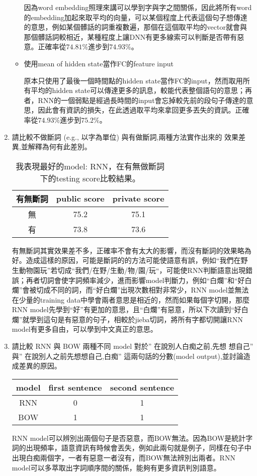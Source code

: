 \documentclass[12pt, a4paper]{article}
\begin{document}
\begin{enumerate}
\begin{itemize}
    因為word embedding照理來講可以學到字與字之間關係，因此將所有word的embedding加起來取平均的向量，可以某個程度上代表這個句子想傳達的意思，例如某個髒話的詞重複數遍，那個在這個取平均的vector就會與那個髒話詞較相近，某種程度上讓DNN有更多線索可以判斷是否帶有惡意。正確率從$74.81\%$進步到$74.93\%$。
    \item 使用mean of hidden state當作FC的feature input\par
    原本只使用了最後一個時間點的hidden state當作FC的input，然而取用所有平均的hidden state可以傳達更多的訊息，較能代表整個語句的意思；再者，RNN的一個弱點是經過長時間的input會忘掉較先前的段句子傳達的意思，因此會有資訊的損失，在此透過取平均來拿回更多丟失的資訊。正確率從$74.93\%$進步到$75.2\%$。
\end{itemize}
\item 請比較不做斷詞 (e.g., 以字為單位) 與有做斷詞,兩種方法實作出來的
效果差異,並解釋為何有此差別。\par
\begin{table}[H]
    \centering
    \begin{tabular}{|c|c|c|}\hline
        有無斷詞&public score&private score\\\hline
        無&75.2&75.1\\ \hline
        有&73.8&73.6\\ \hline
    \end{tabular}
    \caption{我表現最好的model: RNN，在有無做斷詞下的testing score比較結果。}
\end{table}
有無斷詞其實效果差不多，正確率不會有太大的影響，而沒有斷詞的效果略為好。造成這樣的原因，可能是斷詞的的方法可能使語意有誤，例如“我們在野生動物園玩”若切成“我們/在野/生動/物/園/玩“，可能使RNN判斷語意出現錯誤；再者切詞會使字詞頻率減少，進而影響model判斷力，例如“白爛”和“好白爛”會被切成不同的詞，而“好白爛”出現次數相對非常少，RNN model並無法在少量的training data中學會兩者意思是相近的，然而如果每個字切開，那麼RNN model先學到“好”有更加的意思，且“白爛”有惡意，所以下次讀到“好白爛”就學到這句是有惡意的句子，相較於jieba切詞，將所有字都切開讓RNN model有更多自由，可以學到中文真正的意思。

\item 請比較 RNN 與 BOW 兩種不同 model 對於” 在說別人白痴之前,先想
想自己” 與” 在說別人之前先想想自己,白痴” 這兩句話的分數(model output),並討論造成差異的原因。\par
\begin{table}[H]
    \centering
    \begin{tabular}{|c|c|c|}\hline
        model&first sentence&second sentence\\\hline
        RNN&0&1\\ \hline
        BOW&1&1\\ \hline
    \end{tabular}
\end{table}
RNN model可以辨別出兩個句子是否惡意，而BOW無法。因為BOW是統計字詞的出現頻率，語意資訊有時候會丟失，例如此兩句就是例子，同樣在句子中出現白痴兩個字，一者有惡意一者沒有，而BOW無法辨別出兩者。RNN model可以多萃取出字詞順序間的關係，能夠有更多資訊判別語意。


\end{enumerate}
\end{document}
